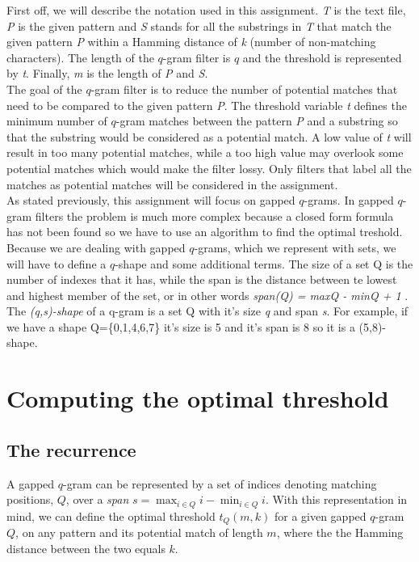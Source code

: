 \documentclass[paper=a4, fontsize=11pt]{scrartcl} %
\numberwithin{equation}{section} %
\numberwithin{figure}{section} %
\numberwithin{table}{section} %
\begin{document}
First off, we will describe the notation used in this assignment. \textit{T} is the text file, \textit{P} is the given pattern and \textit{S} stands 
for all the substrings in \textit{T} that match the given pattern \textit{P} within a Hamming distance of \textit{k} (number of non-matching characters). 
The length of the $q$-gram filter is $q$ and the threshold is represented by \textit{t}. Finally, \textit{m} is the length of \textit{P} and \textit{S}. \\
The goal of the $q$-gram filter is to reduce the number of potential matches that need to be compared to the given pattern \textit{P}. 
The threshold variable \textit{t} defines the minimum number of $q$-gram matches between the pattern \textit{P} and 
a substring so that the substring would be considered as a potential match. A low value of \textit{t} will result in too many potential matches, 
while a too high value may overlook some potential matches which would make the filter lossy. Only filters that label all the matches as 
potential matches will be considered in the assignment.\\
As stated previously, this assignment will focus on gapped $q$-grams. In gapped $q$-gram filters the problem is much more complex
because a closed form formula has not been found so we have to use an algorithm to find the optimal treshold.\\
Because we are dealing with gapped $q$-grams, which we represent with sets, we will have to define a $q$-shape and
 some additional terms. The size of a set Q is the number of indexes that it has, while the span is the distance between te lowest
and highest member of the set, or in other words \textit{span(Q) = maxQ - minQ + 1} . The \textit{(q,s)-shape} of a q-gram is a set Q with it's
size \textit{q} and span \textit{s}. For example, if we have a shape Q=\{0,1,4,6,7\} it's size is 5 and it's span is 8 so it is a (5,8)-shape.



\section{Computing the optimal threshold}
\label{sec:compopt}
\subsection{The recurrence}
  \label{subsec:rec}
  A gapped $q$-gram can be represented by a set of indices denoting matching positions, $Q$, over a \textit{span} $s = \max_{i \in Q} i - \min_{i \in Q} i$.
With this representation in mind, we can define the optimal threshold $t_Q(m, k)$ for a given gapped $q$-gram $Q$, on any pattern and its potential match of length $m$, where the the Hamming distance between the two equals $k$.
\end{document}

